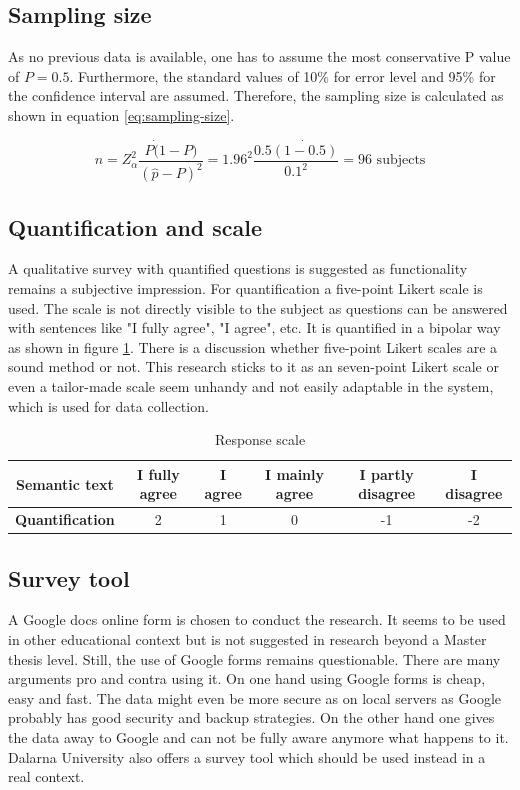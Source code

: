 \documentclass[12pt,a4paper,paper=a4,oneside,titlepage,pdftex]{scrartcl}
\begin{document}
\subsection{Sampling size}
As no previous data is available, one has to assume the most conservative P value of $ P = 0.5 $. Furthermore, the standard values of 10\% for error level and 95\% for the confidence interval are assumed. Therefore, the sampling size is calculated as shown in equation \ref{eq:sampling-size}.

\begin{equation}
n = Z^2_\alpha \frac{P\dot(1-P)}{(\hat{p}-P)^2} = 1.96^2\frac{0.5\dot{(1-0.5)}}{0.1^2}=96 \text{ subjects}
\label{eq:sampling-size}
\end{equation}

\subsection{Quantification and scale}

A qualitative survey \citep{sofaer1999qualitative} with quantified questions is suggested as functionality remains a subjective impression. For quantification a five-point Likert scale \citep{likert1932technique} is used. The scale is not directly visible to the subject as questions can be answered with sentences like "I fully agree", "I agree", etc. It is quantified in a bipolar way as shown in figure \ref{tab:response-scale}.  There is a discussion \citep{cummins2000we} whether five-point Likert scales are a sound method or not. This research sticks to it as an seven-point Likert scale \citep{chimi2009likert} or even a tailor-made scale seem unhandy and not easily adaptable in the system, which is used for data collection.

\begin{table}[h!]
\begin{tabular}{|c|| c|c|c|c|c|}
\hline
\textbf{Semantic text} & I fully agree & I agree & I mainly agree & I partly disagree & I disagree \\ \hline
\textbf{Quantification} & 2 & 1 & 0 & -1 & -2 \\ \hline
\end{tabular}
	\caption{Response scale}
	\label{tab:response-scale}
\end{table}


\subsection{Survey tool}
A Google docs online form is chosen to conduct the research. It seems to be used in other educational context \citep{gehringer2010daily} but is not suggested in research beyond a Master thesis level. Still, the use of Google forms remains questionable. There are many arguments pro and contra using it. On one hand using Google forms is cheap, easy and fast. The data might even be more secure as on local servers as Google probably has good security and backup strategies. On the other hand one gives the data away to Google and can not be fully aware anymore what happens to it. Dalarna University also offers a survey tool which should be used instead in a real context.
\end{document}
